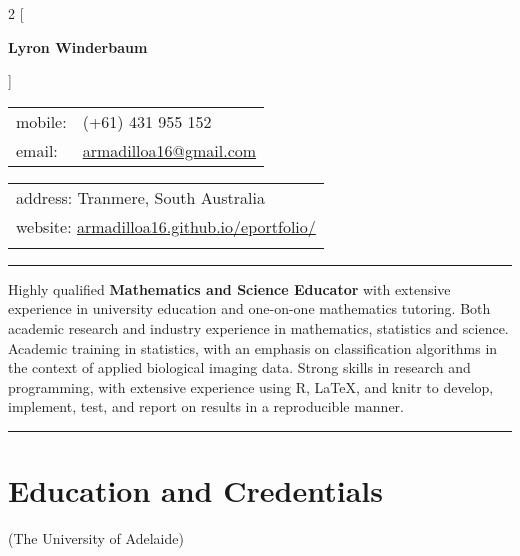 \documentclass[a4paper,12pt]{report}
\begin{document}
 

\begin{multicols}{2}
[
\begin{center}
{\Large \textbf{Lyron Winderbaum}} \\ \vspace{4mm}
\end{center}
]

\begin{flushleft}
\begin{tabular}{ll}
mobile: & (+61) 431 955 152 \\
email: & \href{mailto:armadilloa16@gmail.com}{armadilloa16@gmail.com} \\
\end{tabular}
\end{flushleft}

\begin{flushright}
\begin{tabular}{l}
address: Tranmere, South Australia \\
website: \href{https://armadilloa16.github.io/eportfolio/}{armadilloa16.github.io/eportfolio/} \\
{}
\end{tabular}
\end{flushright}
\end{multicols}                                  

\hrule
\vspace{0.4cm}

Highly qualified \textbf{Mathematics and Science Educator} with extensive experience in university education and one-on-one mathematics tutoring. Both academic research and industry experience in mathematics, statistics and science. Academic training in statistics, with an emphasis on classification algorithms in the context of applied biological imaging data. Strong skills in research and programming, with extensive experience using R, \LaTeX, and knitr to develop, implement, test, and report on results in a reproducible manner.

\vspace{0.4cm}
\hrule

\section*{Education and Credentials}
(The University of Adelaide)
\end{document}
